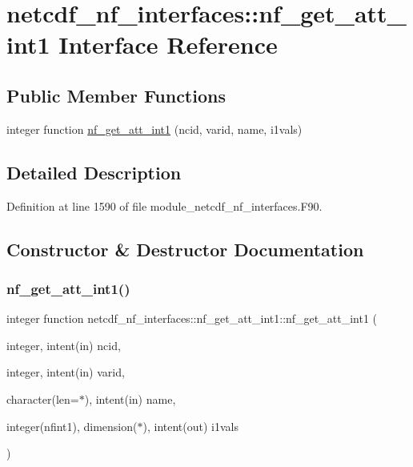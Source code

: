 \hypertarget{interfacenetcdf__nf__interfaces_1_1nf__get__att__int1}{}\section{netcdf\+\_\+nf\+\_\+interfaces\+:\+:nf\+\_\+get\+\_\+att\+\_\+int1 Interface Reference}
\label{interfacenetcdf__nf__interfaces_1_1nf__get__att__int1}
\subsection*{Public Member Functions}
\begin{DoxyCompactItemize}
\item 
integer function \hyperlink{interfacenetcdf__nf__interfaces_1_1nf__get__att__int1_ae4fead3439bbca0aa2a66f969c00d844}{nf\+\_\+get\+\_\+att\+\_\+int1} (ncid, varid, name, i1vals)
\end{DoxyCompactItemize}


\subsection{Detailed Description}


Definition at line 1590 of file module\+\_\+netcdf\+\_\+nf\+\_\+interfaces.\+F90.



\subsection{Constructor \& Destructor Documentation}
\mbox{\label{interfacenetcdf__nf__interfaces_1_1nf__get__att__int1_ae4fead3439bbca0aa2a66f969c00d844}} 
\subsubsection{\texorpdfstring{nf\+\_\+get\+\_\+att\+\_\+int1()}{nf\_get\_att\_int1()}}
{\footnotesize\ttfamily integer function netcdf\+\_\+nf\+\_\+interfaces\+::nf\+\_\+get\+\_\+att\+\_\+int1\+::nf\+\_\+get\+\_\+att\+\_\+int1 (\begin{DoxyParamCaption}\item[{integer, intent(in)}]{ncid,  }\item[{integer, intent(in)}]{varid,  }\item[{character(len=$\ast$), intent(in)}]{name,  }\item[{integer(nfint1), dimension($\ast$), intent(out)}]{i1vals }\end{DoxyParamCaption})}



